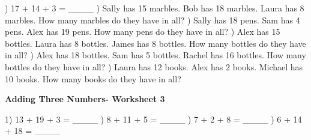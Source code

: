 \documentclass{article}%
\begin{document}
\newline%
\newline%
) 17 + 14 + 3 = \_\_\_\_%
\newline%
\newline%
) Sally has 15 marbles. Bob has 18 marbles. Laura has 8 marbles. How many marbles do they have in all?%
\newline%
\newline%
) Sally has 18 pens. Sam has 4 pens. Alex has 19 pens. How many pens do they have in all?%
\newline%
\newline%
) Alex has 15 bottles. Laura has 8 bottles. James has 8 bottles. How many bottles do they have in all?%
\newline%
\newline%
) Alex has 18 bottles. Sam has 5 bottles. Rachel has 16 bottles. How many bottles do they have in all?%
\newline%
\newline%
) Laura has 12 books. Alex has 2 books. Michael has 10 books. How many books do they have in all?%
\newline%
\newline%
\newline%
\pagebreak%
\large%
\begin{center}%
\textbf{Adding Three Numbers- Worksheet 3}%
\newline%
\newline%
\newline%
\end{center} \normalsize%
1) 13 + 19 + 3 = \_\_\_\_%
\newline%
\newline%
) 8 + 11 + 5 = \_\_\_\_%
\newline%
\newline%
) 7 + 2 + 8 = \_\_\_\_%
\newline%
\newline%
) 6 + 14 + 18 = \_\_\_\_%
\newline%
\newline%
\newline%
\end{document}
